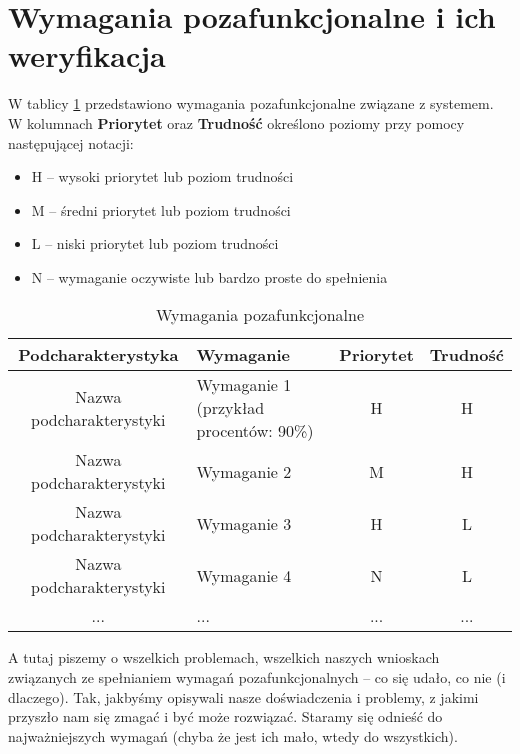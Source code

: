 \section{Wymagania pozafunkcjonalne i ich weryfikacja}

W tablicy \ref{tab:reqs} przedstawiono wymagania pozafunkcjonalne związane z systemem. W kolumnach \textbf{Priorytet} oraz \textbf{Trudność} określono poziomy przy pomocy następującej notacji:

\begin{itemize}
\item H -- wysoki priorytet lub poziom trudności
\item M -- średni priorytet lub poziom trudności
\item L -- niski priorytet lub poziom trudności
\item N -- wymaganie oczywiste lub bardzo proste do spełnienia
\end{itemize}
\begin{table}[h]
\centering
\begin{tabular}{ | c | p{7cm} | c | c | }
\hline
\textbf{Podcharakterystyka} & \textbf{Wymaganie} & \textbf{Priorytet} & \textbf{Trudność} \\ \hline
Nazwa podcharakterystyki & Wymaganie 1 (przykład procentów: 90\%) & H & H \\ \hline
Nazwa podcharakterystyki & Wymaganie 2 & M & H \\ \hline
Nazwa podcharakterystyki & Wymaganie 3 & H & L \\ \hline
Nazwa podcharakterystyki & Wymaganie 4 & N & L \\ \hline
... & ... & ... & ... \\ \hline
\end{tabular}
\caption{Wymagania pozafunkcjonalne}\label{tab:reqs}
\end{table}
A tutaj piszemy o wszelkich problemach, wszelkich naszych wnioskach związanych ze spełnianiem wymagań pozafunkcjonalnych -- co się udało, co nie (i dlaczego). Tak, jakbyśmy opisywali nasze doświadczenia i problemy, z jakimi przyszło nam się zmagać i być może rozwiązać. Staramy się odnieść do najważniejszych wymagań (chyba że jest ich mało, wtedy do wszystkich).